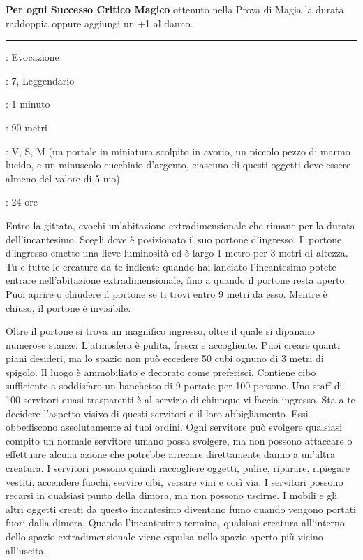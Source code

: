 \begin{multicols}{2}
\textbf{Per ogni Successo Critico Magico} ottenuto nella Prova di Magia la durata raddoppia oppure aggiungi un +1 al danno.

\smallskip\noindent\rule{\linewidth}{2pt} \hypertarget{Reggia Meravigliosa}{}\medskip{}
\noindent
\begin{description}[noitemsep, topsep=0pt, parsep=0pt, partopsep=0pt, leftmargin=0cm, labelwidth=2.8cm]
	\item[\textbf{Lista di Magia}]: Evocazione
	\item[\textbf{Livello}]: 7, Leggendario
	\item[\textbf{T. di Lancio}]: 1 minuto
	\item[\textbf{Gittata}]: 90 metri
	\item[\textbf{Componenti}]: V, S, M (un portale in miniatura scolpito in avorio, un piccolo pezzo di marmo lucido, e un minuscolo cucchiaio d'argento, ciascuno di questi oggetti deve essere almeno del valore di 5 mo)
	\item[\textbf{Durata}]: 24 ore
\end{description}

Entro la gittata, evochi un'abitazione extradimensionale che rimane per la durata dell'incantesimo. Scegli dove è posizionato il suo portone d'ingresso. Il portone d'ingresso emette una lieve luminosità ed è largo 1 metro per 3 metri di altezza. Tu e tutte le creature da te indicate quando hai lanciato l'incantesimo potete entrare nell'abitazione extradimensionale, fino a quando il portone resta aperto. Puoi aprire o chiudere il portone se ti trovi entro 9 metri da esso. Mentre è chiuso, il portone è invisibile.

Oltre il portone si trova un magnifico ingresso, oltre il quale si dipanano numerose stanze. L'atmosfera è pulita, fresca e accogliente. Puoi creare quanti piani desideri, ma lo spazio non può eccedere 50 cubi ognuno di 3 metri di spigolo. Il luogo è ammobiliato e decorato come preferisci. Contiene cibo sufficiente a soddisfare un banchetto di 9 portate per 100 persone. Uno staff di 100 servitori quasi trasparenti è al servizio di chiunque vi faccia ingresso. Sta a te decidere l'aspetto visivo di questi servitori e il loro abbigliamento. Essi obbediscono assolutamente ai tuoi ordini. Ogni servitore può svolgere qualsiasi compito un normale servitore umano possa svolgere, ma non possono attaccare o effettuare alcuna azione che potrebbe arrecare direttamente danno a un'altra creatura. I servitori possono quindi raccogliere oggetti, pulire, riparare, ripiegare vestiti, accendere fuochi, servire cibi, versare vini e così via. I servitori possono recarsi in qualsiasi punto della dimora, ma non possono uscirne. I mobili e gli altri oggetti creati da questo incantesimo diventano fumo quando vengono portati fuori dalla dimora. Quando l'incantesimo termina, qualsiasi creatura all'interno dello spazio extradimensionale viene espulsa nello spazio aperto più vicino all'uscita.


\end{multicols}
